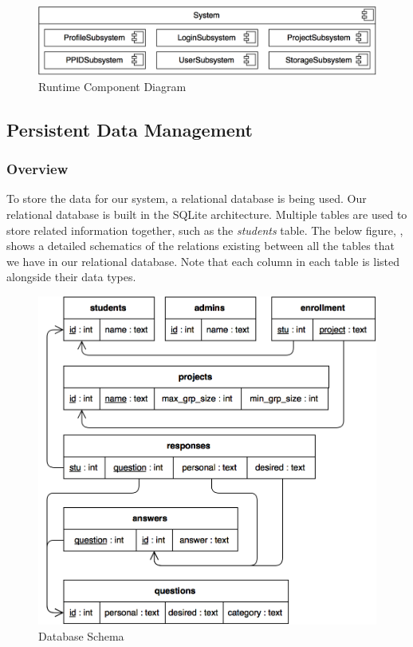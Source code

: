 \documentclass[12pt,letterpaper]{article}
\begin{document}
\begin{figure}[H]
	\centering{}
	\includegraphics[scale=0.35]{imgs/d3/decomp/runtime-component-diagram.png}
	\caption{Runtime Component Diagram}
\end{figure}

\subsection{Persistent Data Management}
\subsubsection{Overview}

To store the data for our system, a relational database is being used. Our relational database is built in the SQLite architecture. Multiple tables are used to store related information together, such as the \textit{students} table. The below figure, , shows a detailed schematics of the relations existing between all the tables that we have in our relational database. Note that each column in each table is listed alongside their data types.

\begin{figure}[H]
	\centering{}
	\includegraphics[scale=0.40]{imgs/d3/db/database-schema-diagram.png}
	\caption{Database Schema}
\end{figure}
\end{document}

